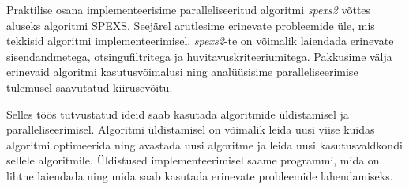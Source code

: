 Praktilise osana implementeerisime paralleliseeritud algoritmi \emph{spexs2} võttes aluseks algoritmi SPEXS\cite{spexs}. Seejärel arutlesime erinevate probleemide üle, mis tekkisid algoritmi implementeerimisel. \emph{spexs2}-te on võimalik laiendada erinevate sisendandmetega, otsingufiltritega ja huvitavuskriteeriumitega. Pakkusime välja erinevaid algoritmi kasutusvõimalusi ning analüüsisime paralleliseerimise tulemusel saavutatud kiirusevõitu.

Selles töös tutvustatud ideid saab kasutada algoritmide üldistamisel ja paralleliseerimisel. Algoritmi üldistamisel on võimalik leida uusi viise kuidas algoritmi optimeerida ning avastada uusi algoritme ja leida uusi kasutusvaldkondi sellele algoritmile. Üldistused implementeerimisel saame programmi, mida on lihtne laiendada ning mida saab kasutada erinevate probleemide lahendamiseks.
